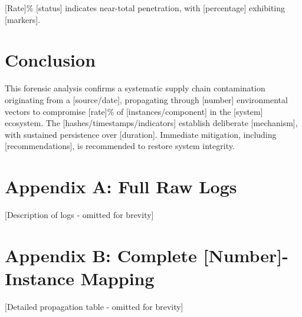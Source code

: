 \documentclass[12pt,a4paper]{article}
\begin{document}
[Rate]\% [status] indicates near-total penetration, with [percentage] exhibiting [markers].

\section{Conclusion}
This forensic analysis confirms a systematic supply chain contamination originating from a [source/date], propagating through [number] environmental vectors to compromise [rate]\% of [instances/component] in the [system] ecosystem. The [hashes/timestamps/indicators] establish deliberate [mechanism], with sustained persistence over [duration]. Immediate mitigation, including [recommendations], is recommended to restore system integrity.

\section*{Appendix A: Full Raw Logs}
[Description of logs - omitted for brevity]

\section*{Appendix B: Complete [Number]-Instance Mapping}
[Detailed propagation table - omitted for brevity]
\end{document}
